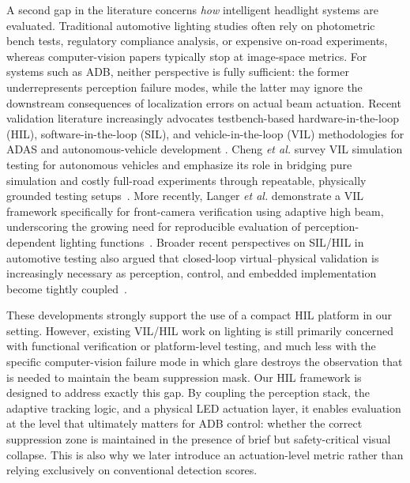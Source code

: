 \documentclass[pdflatex,sn-mathphys-num]{sn-jnl}%
\theoremstyle{thmstyleone}%
\theoremstyle{thmstyletwo}%
\theoremstyle{thmstylethree}%
\begin{document}

A second gap in the literature concerns \emph{how} intelligent headlight systems are evaluated. Traditional automotive lighting studies often rely
on photometric bench tests, regulatory compliance analysis, or expensive on-road experiments, whereas computer-vision papers typically stop at image-space metrics. For systems such as ADB, neither perspective is fully sufficient: the former underrepresents perception failure modes, while the latter may ignore the downstream consequences of localization errors on actual beam actuation.
Recent validation literature increasingly advocates testbench-based hardware-in-the-loop (HIL), software-in-the-loop (SIL), and vehicle-in-the-loop (VIL) methodologies for ADAS and autonomous-vehicle
development \cite{cheng2024survey, langer2026vehicle,balan2025perspective}. Cheng \emph{et al.} survey VIL simulation testing for autonomous vehicles and emphasize its role in bridging pure simulation and costly full-road experiments through repeatable, physically grounded
testing setups~\cite{cheng2024survey}. More recently, Langer \emph{et al.} demonstrate a VIL framework specifically for front-camera verification using adaptive high beam, underscoring the growing need for
reproducible evaluation of perception-dependent lighting functions~\cite{langer2026vehicle}. Broader recent perspectives on SIL/HIL in automotive testing also argued that closed-loop virtual--physical validation is increasingly necessary as perception, control, and embedded implementation become tightly coupled~\cite{balan2025perspective}.

These developments strongly support the use of a compact HIL platform in our setting. However, existing VIL/HIL work on lighting is still primarily concerned with functional verification or platform-level testing, and much less with the specific computer-vision failure mode in which glare destroys the observation that is needed to maintain the beam
suppression mask. Our HIL framework is designed to address exactly this gap. By coupling the perception stack, the adaptive tracking logic, and a physical LED actuation layer, it enables evaluation at the level that ultimately matters for ADB control: whether the correct suppression zone is maintained in the presence of brief but safety-critical visual collapse. This is also why we later introduce an actuation-level metric
rather than relying exclusively on conventional detection scores.
\end{document}

